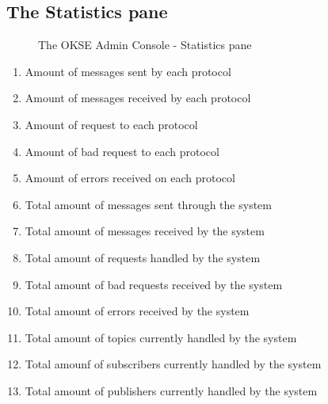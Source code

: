 \subsection{The Statistics pane}
\begin{center}
  \begin{figure}[ht!]
    \caption{The OKSE Admin Console - Statistics pane} 
    \label{fig:OKSE Admin Console - Statistics pane}
  \end{figure}
\end{center}
\begin{enumerate}
\item Amount of messages sent by each protocol
\item Amount of messages received by each protocol
\item Amount of request to each protocol
\item Amount of bad request to each protocol
\item Amount of errors received on each protocol
\item Total amount of messages sent through the system
\item Total amount of messages received by the system
\item Total amount of requests handled by the system
\item Total amount of bad requests received by the system
\item Total amount of errors received by the system
\item Total amount of topics currently handled by the system
\item Total amounf of subscribers currently handled by the system
\item Total amount of publishers currently handled by the system
\end{enumerate}
